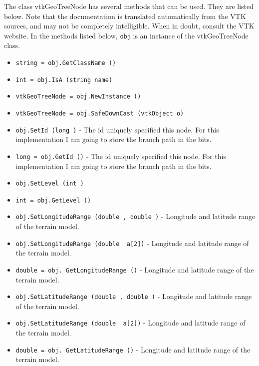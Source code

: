 The class vtkGeoTreeNode has several methods that can be used.
  They are listed below.
Note that the documentation is translated automatically from the VTK sources,
and may not be completely intelligible.  When in doubt, consult the VTK website.
In the methods listed below, \verb|obj| is an instance of the vtkGeoTreeNode class.
\begin{itemize}
\item  \verb|string = obj.GetClassName ()|

\item  \verb|int = obj.IsA (string name)|

\item  \verb|vtkGeoTreeNode = obj.NewInstance ()|

\item  \verb|vtkGeoTreeNode = obj.SafeDownCast (vtkObject o)|

\item  \verb|obj.SetId (long )| -  The id uniquely specified this node.
 For this implementation I am going to store the branch path
 in the bits.

\item  \verb|long = obj.GetId ()| -  The id uniquely specified this node.
 For this implementation I am going to store the branch path
 in the bits.

\item  \verb|obj.SetLevel (int )|

\item  \verb|int = obj.GetLevel ()|

\item  \verb|obj.SetLongitudeRange (double , double )| -  Longitude and latitude range of the terrain model.

\item  \verb|obj.SetLongitudeRange (double  a[2])| -  Longitude and latitude range of the terrain model.

\item  \verb|double = obj. GetLongitudeRange ()| -  Longitude and latitude range of the terrain model.

\item  \verb|obj.SetLatitudeRange (double , double )| -  Longitude and latitude range of the terrain model.

\item  \verb|obj.SetLatitudeRange (double  a[2])| -  Longitude and latitude range of the terrain model.

\item  \verb|double = obj. GetLatitudeRange ()| -  Longitude and latitude range of the terrain model.


\end{itemize}
